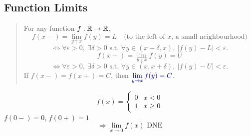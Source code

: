 \subsection{Function Limits}

\begin{quote}
    For any function $f: \mathbb{R} \to \mathbb{R}$,
    \[f(x-) = \lim_{y\uparrow x} f(y) = L \quad \text{(to the left of $x$, a small neighbourhood)}\]
    \[\Leftrightarrow \forall \varepsilon>0,\ \exists \delta>0 \text{ s.t. } \forall y \in (x-\delta,x),\ \left\lvert f(y)-L\right\rvert < \varepsilon.\]
    \[f(x+) = \lim_{y\downarrow x} f(y) = U\]
    \[\Leftrightarrow \forall \varepsilon>0,\ \exists \delta>0 \text{ s.t. } \forall y \in (x,x+\delta),\ \left\lvert f(y)-U\right\rvert < \varepsilon.\]
    If $f(x-) = f(x+) = C$, then $\textcolor{blue!55!black}{\displaystyle\lim_{y\to x} f(y) = C}$.
\end{quote}

\begin{example}
    \[f(x) = \begin{cases} 0 & x<0 \\ 1 & x\geq 0 \end{cases}\]
    $f(0-) = 0$, $f(0+) = 1$
    \[\Rightarrow \lim_{x\to 0} f(x) \text{ DNE}\]
\end{example}
